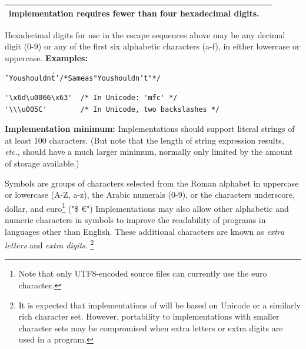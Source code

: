 \begin{description}
\begin{table}
\begin{tabularx}{\textwidth}{>{\bfseries}lX}
implementation requires fewer than four hexadecimal digits.
\\\bottomrule
\end{tabularx}
\end{table}
 Hexadecimal digits for use in the escape sequences above may be any
decimal digit (0-9) or any of the first six alphabetic
characters (a-f), in either lowercase or uppercase.
 \textbf{Examples:}
\begin{alltt}
  'You shouldn\'t'  /* Same as "You shouldn't" */
  \end{alltt}
\begin{lstlisting}
'\x6d\u0066\x63'  /* In Unicode: 'mfc' */
'\\\u005C'        /* In Unicode, two backslashes */
\end{lstlisting}
 \textbf{Implementation minimum:} Implementations should support
literal strings of at least 100 characters.
(But note that the length of string expression results, \emph{etc.}, should
have a much larger minimum, normally only limited by the amount of
storage available.)
\item[Symbols]\label{refsyms}

Symbols are groups of characters selected from the Roman alphabet
in uppercase or lowercase (A-Z, a-z), the Arabic numerals
(0-9), or the characters underscore, dollar, and euro\footnote{
Note that only UTF8-encoded source files can currently use the euro
character.} ("\textunderscore \$ \euro")
Implementations may also allow other alphabetic and numeric characters
in symbols to improve the readability of programs in languages other
than English.  These additional characters are known as \emph{extra
letters} and \emph{extra digits}.
\footnote{
It is expected that implementations of \crexx{} will be based on
Unicode or a similarly rich character set.
However, portability to implementations with smaller character sets may
be compromised when extra letters or extra digits are used in a program.
}
 

\end{description}

